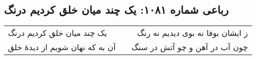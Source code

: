 \begin{center}
\section*{رباعی شماره ۱۰۸۱: یک چند میان خلق کردیم درنگ}
\label{sec:1081}
\begin{longtable}{l p{0.5cm} r}
یک چند میان خلق کردیم درنگ
&&
ز ایشان بوفا نه بوی دیدیم نه رنگ
\\
آن به که نهان شویم از دیدهٔ خلق
&&
چون آب در آهن و چو آتش در سنگ
\\
\end{longtable}
\end{center}

